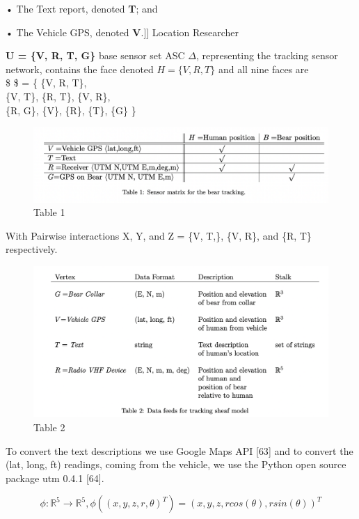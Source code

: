 \documentclass[
]{article}
\begin{document}
• The Text report, denoted \textbf{T}; and

• The Vehicle GPS, denoted \textbf{V}.{]}{]} Location Researcher

\textbf{U = \{V, R, T, G\}} base sensor set ASC \(\Delta\), representing
the tracking sensor network, contains the face denoted
\(H = \{V, R, T \}\) and all nine faces are\\
\$ \Delta\$ = \{ \{V, R, T\},\\
\{V, T\}, \{R, T\}, \{V, R\},\\
\{R, G\}, \{V\}, \{R\}, \{T\}, \{G\} \}

\begin{figure}
\centering
\includegraphics{GeoTable1.png}
\caption{Table 1}
\end{figure}

With Pairwise interactions X, Y, and Z = \{V, T,\}, \{V, R\}, and \{R,
T\} respectively.

\begin{figure}
\centering
\includegraphics{GeoTable2.png}
\caption{Table 2}
\end{figure}

To convert the text descriptions we use Google Maps API {[}63{]} and to
convert the (lat, long, ft) readings, coming from the vehicle, we use
the Python open source package utm 0.4.1 {[}64{]}.

\[\phi: \mathbb{R}^5 \to \mathbb{R}^5, \phi((x, y, z, r, \theta)^T) = (x, y, z, r cos(\theta), rsin(\theta))^T  \]
\end{document}
